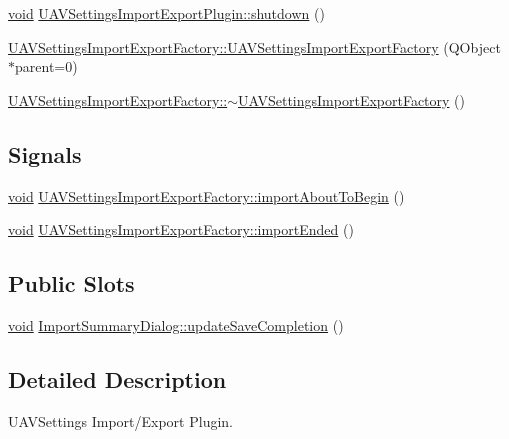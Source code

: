 \begin{DoxyCompactItemize}
\item 
\hyperlink{group___u_a_v_objects_plugin_ga444cf2ff3f0ecbe028adce838d373f5c}{void} \hyperlink{group___u_a_v_settings_import_export_ga5e2dd335427148df64c9b2b3b9a16e8d}{U\-A\-V\-Settings\-Import\-Export\-Plugin\-::shutdown} ()
\item 
\hyperlink{group___u_a_v_settings_import_export_ga487d479be4ae96eddde7372c94c27bd7}{U\-A\-V\-Settings\-Import\-Export\-Factory\-::\-U\-A\-V\-Settings\-Import\-Export\-Factory} (Q\-Object $\ast$parent=0)
\item 
\hyperlink{group___u_a_v_settings_import_export_gac83bc105170e6ccdb6e39818edd45b57}{U\-A\-V\-Settings\-Import\-Export\-Factory\-::$\sim$\-U\-A\-V\-Settings\-Import\-Export\-Factory} ()
\end{DoxyCompactItemize}
\subsection*{Signals}
\begin{DoxyCompactItemize}
\item 
\hyperlink{group___u_a_v_objects_plugin_ga444cf2ff3f0ecbe028adce838d373f5c}{void} \hyperlink{group___u_a_v_settings_import_export_ga1d7a913adac9094e20d9086a8a1cb5c3}{U\-A\-V\-Settings\-Import\-Export\-Factory\-::import\-About\-To\-Begin} ()
\item 
\hyperlink{group___u_a_v_objects_plugin_ga444cf2ff3f0ecbe028adce838d373f5c}{void} \hyperlink{group___u_a_v_settings_import_export_ga456326e359badf7b245abf501d9a6006}{U\-A\-V\-Settings\-Import\-Export\-Factory\-::import\-Ended} ()
\end{DoxyCompactItemize}
\subsection*{Public Slots}
\begin{DoxyCompactItemize}
\item 
\hyperlink{group___u_a_v_objects_plugin_ga444cf2ff3f0ecbe028adce838d373f5c}{void} \hyperlink{group___u_a_v_settings_import_export_gaf0532662634d23c11f3812ece8a170bb}{Import\-Summary\-Dialog\-::update\-Save\-Completion} ()
\end{DoxyCompactItemize}


\subsection{Detailed Description}
U\-A\-V\-Settings Import/\-Export Plugin. 

